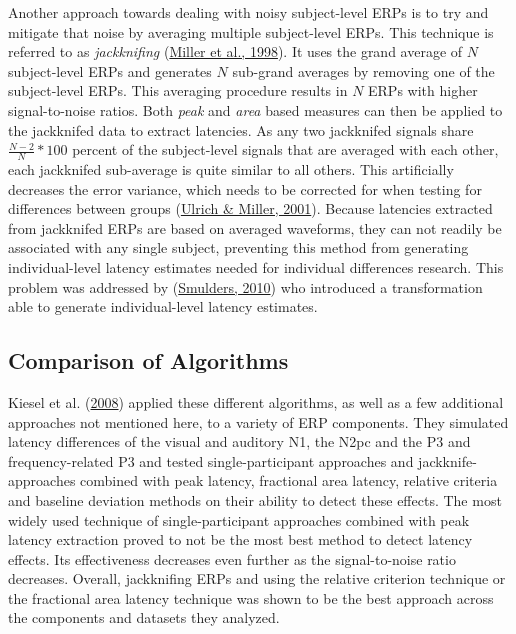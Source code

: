 \documentclass[
  man,floatsintext]{apa7}
\begin{document}
Another approach towards dealing with noisy subject-level ERPs is to try and mitigate that noise by averaging multiple subject-level ERPs. This technique is referred to as \emph{jackknifing} (\protect\hyperlink{ref-miller1998jackknife}{Miller et al., 1998}). It uses the grand average of \(N\) subject-level ERPs and generates \(N\) sub-grand averages by removing one of the subject-level ERPs. This averaging procedure results in \(N\) ERPs with higher signal-to-noise ratios. Both \emph{peak} and \emph{area} based measures can then be applied to the jackknifed data to extract latencies. As any two jackknifed signals share \(\frac{N-2}{N} * 100\) percent of the subject-level signals that are averaged with each other, each jackknifed sub-average is quite similar to all others. This artificially decreases the error variance, which needs to be corrected for when testing for differences between groups (\protect\hyperlink{ref-ulrich2001using}{Ulrich \& Miller, 2001}). Because latencies extracted from jackknifed ERPs are based on averaged waveforms, they can not readily be associated with any single subject, preventing this method from generating individual-level latency estimates needed for individual differences research. This problem was addressed by (\protect\hyperlink{ref-smulders2010simplifying}{Smulders, 2010}) who introduced a transformation able to generate individual-level latency estimates.

\hypertarget{comparison-of-algorithms}{%
\subsection{Comparison of Algorithms}\label{comparison-of-algorithms}}

Kiesel et al. (\protect\hyperlink{ref-kiesel2008measurement}{2008}) applied these different algorithms, as well as a few additional approaches not mentioned here, to a variety of ERP components. They simulated latency differences of the visual and auditory N1, the N2pc and the P3 and frequency-related P3 and tested single-participant approaches and jackknife-approaches combined with peak latency, fractional area latency, relative criteria and baseline deviation methods on their ability to detect these effects. The most widely used technique of single-participant approaches combined with peak latency extraction proved to not be the most best method to detect latency effects. Its effectiveness decreases even further as the signal-to-noise ratio decreases. Overall, jackknifing ERPs and using the relative criterion technique or the fractional area latency technique was shown to be the best approach across the components and datasets they analyzed.
\end{document}
